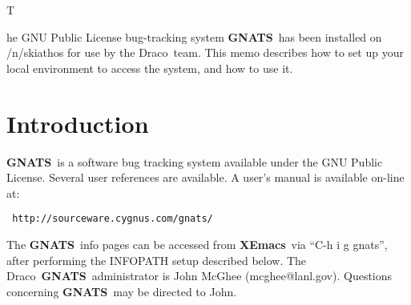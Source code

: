 \documentclass[11pt]{nmemo}
\newcommand{\draco}{{\normalfont\sffamily Draco}}
\newcommand{\xemacs}{{\normalfont\bfseries XEmacs}}
\newcommand{\gnats}{{\normalfont\bfseries GNATS}}
\begin{document}

\subject{\gnats\ Bug Tracking System}

\date{\today}





\opening

The GNU Public License bug-tracking system \gnats\ has been 
installed on /n/skiathos for use by the \draco\ team. This memo
describes how to set up your local environment to access the 
system, and how to use it.


\section{Introduction}

\gnats\ is a software bug tracking system available under
the GNU Public License. Several user references are available.
A user's manual is available on-line at:
\begin{verbatim} http://sourceware.cygnus.com/gnats/ \end{verbatim}
The \gnats\ info pages can be accessed from \xemacs\ via ``C-h i g gnats'',
after performing the INFOPATH setup described below.
The \draco\ \gnats\ administrator is John McGhee (mcghee@lanl.gov).
Questions concerning \gnats\ may be directed to John.
\end{document}
